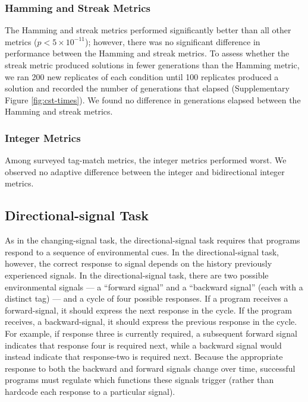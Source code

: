 \subsubsection{Hamming and Streak Metrics}

The Hamming and streak metrics performed significantly better than all other metrics ($p < 5\times10^{-11}$); however, there was no significant difference in performance between the Hamming and streak metrics.
To assess whether the streak metric produced solutions in fewer generations than the Hamming metric, we ran 200 new replicates of each condition until 100 replicates produced a solution and recorded the number of generations that elapsed (Supplementary Figure \ref{fig:cst-times}).
We found no difference in generations elapsed between the Hamming and streak metrics.

\subsubsection{Integer Metrics}

Among surveyed tag-match metrics, the integer metrics performed worst.
We observed no adaptive difference  between the integer and bidirectional integer metrics.

\subsection{Directional-signal Task} \label{sec:directional-signal}



As in the changing-signal task, the directional-signal task requires that programs respond to a sequence of environmental cues.
In the directional-signal task, however, the correct response to signal depends on the history previously experienced signals.
In the directional-signal task, there are two possible environmental signals --- a ``forward signal'' and a ``backward signal'' (each with a distinct tag) ---  and a cycle of four possible responses.
If a program receives a forward-signal, it should express the next response in the cycle.
If the program receives, a backward-signal, it should express the previous response in the cycle.
For example, if response three is currently required, a subsequent forward signal indicates that response four is required next, while a backward signal would instead indicate that response-two is required next.
Because the appropriate response to both the backward and forward signals change over time, successful programs must regulate which functions these signals trigger (rather than hardcode each response to a particular signal).

